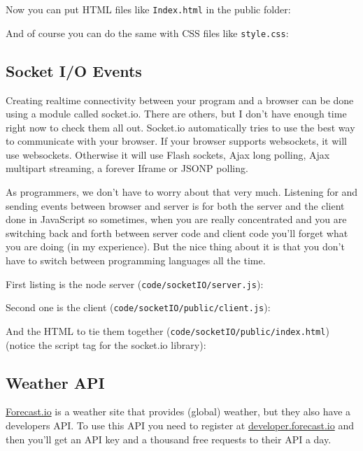 \documentclass[a4paper]{report}
\begin{document}
\noindent Now you can put HTML files like \texttt{Index.html} in the public folder:


\noindent And of course you can do the same with CSS files like \texttt{style.css}:


\subsection*{Socket I/O Events}
Creating realtime connectivity between your program and a browser can be done using a module called socket.io. There are others, but I don't have enough time right now to check them all out. Socket.io automatically tries to use the best way to communicate with your browser. If your browser supports websockets, it will use websockets. Otherwise it will use Flash sockets, Ajax long polling, Ajax multipart streaming, a forever Iframe or JSONP polling.

As programmers, we don't have to worry about that very much. Listening for and sending events between browser and server is for both the server and the client done in JavaScript so sometimes, when you are really concentrated and you are switching back and forth between server code and client code you'll forget what you are doing (in my experience). But the nice thing about it is that you don't have to switch between programming languages all the time.

First listing is the node server (\texttt{code/socketIO/server.js}):


\noindent Second one is the client (\texttt{code/socketIO/public/client.js}):


\noindent And the HTML to tie them together (\texttt{code/socketIO/public/index.html}) (notice the script tag for the socket.io library):


\subsection*{Weather API}
\href{http://forecast.io/}{Forecast.io} is a weather site that provides (global) weather, but they also have a developers API. To use this API you need to register at \href{https://developer.forecast.io/}{developer.forecast.io} and then you'll get an API key and a thousand free requests to their API a day.
\end{document}
